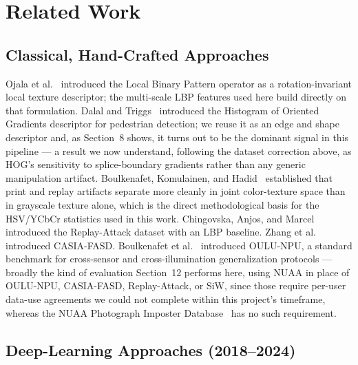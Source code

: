 \documentclass[11pt]{article}
\begin{document}
\section{Related Work}

\subsection{Classical, Hand-Crafted Approaches}

Ojala et al.~\cite{ojala2002} introduced the Local Binary Pattern operator as a rotation-invariant local texture descriptor; the multi-scale LBP features used here build directly on that formulation. Dalal and Triggs~\cite{dalal2005} introduced the Histogram of Oriented Gradients descriptor for pedestrian detection; we reuse it as an edge and shape descriptor and, as Section~8 shows, it turns out to be the dominant signal in this pipeline --- a result we now understand, following the dataset correction above, as HOG's sensitivity to splice-boundary gradients rather than any generic manipulation artifact. Boulkenafet, Komulainen, and Hadid~\cite{boulkenafet2015,boulkenafet2016} established that print and replay artifacts separate more cleanly in joint color-texture space than in grayscale texture alone, which is the direct methodological basis for the HSV/YCbCr statistics used in this work. Chingovska, Anjos, and Marcel~\cite{chingovska2012} introduced the Replay-Attack dataset with an LBP baseline. Zhang et al.~\cite{zhang2012} introduced CASIA-FASD. Boulkenafet et al.~\cite{boulkenafet2017} introduced OULU-NPU, a standard benchmark for cross-sensor and cross-illumination generalization protocols --- broadly the kind of evaluation Section~12 performs here, using NUAA in place of OULU-NPU, CASIA-FASD, Replay-Attack, or SiW, since those require per-user data-use agreements we could not complete within this project's timeframe, whereas the NUAA Photograph Imposter Database~\cite{tan2010} has no such requirement.

\subsection{Deep-Learning Approaches (2018--2024)}
\end{document}
